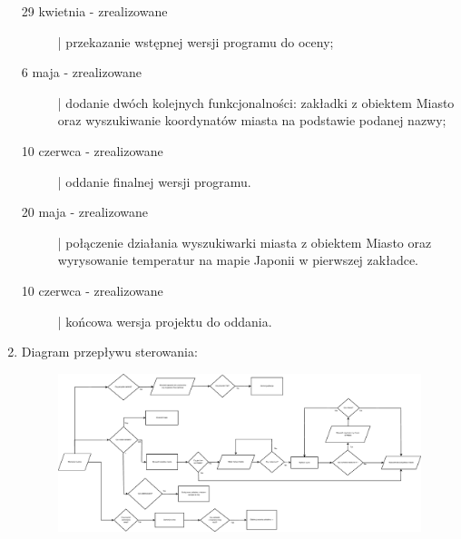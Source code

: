 \documentclass[a4paper]{article}
\begin{document}
\begin{enumerate}
\begin{description}
\item[29 kwietnia - zrealizowane] | przekazanie wstępnej wersji programu do oceny;

\item[6 maja - zrealizowane] | dodanie dwóch kolejnych funkcjonalności: zakładki z obiektem Miasto oraz wyszukiwanie koordynatów miasta na podstawie podanej nazwy;

\item[10 czerwca - zrealizowane] | oddanie finalnej wersji programu.

\item[20 maja - zrealizowane] | połączenie działania wyszukiwarki miasta z obiektem Miasto oraz wyrysowanie temperatur na mapie Japonii w pierwszej zakładce.

\item[10 czerwca - zrealizowane] | końcowa wersja projektu do oddania.
\end{description}

\pagebreak
\item Diagram przepływu sterowania:\\
\begin{figure}[H]
\includegraphics[width=15cm]{przeplyw.eps}
\end{figure}


\end{enumerate}
\end{document}
